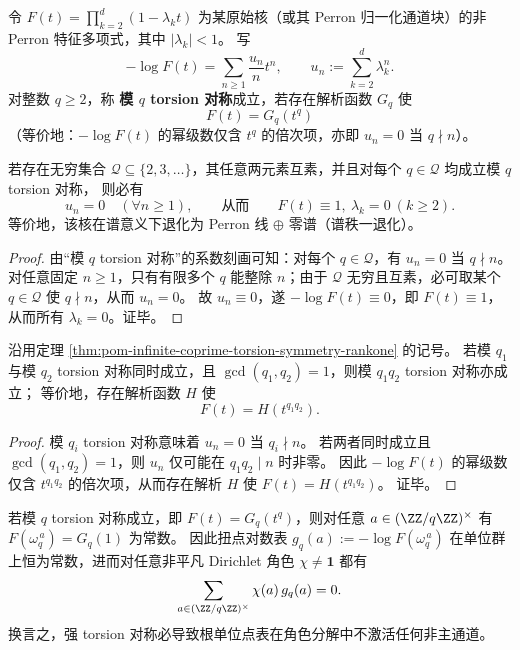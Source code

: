 \begin{theorem}\label{thm:pom-infinite-coprime-torsion-symmetry-rankone}
令 \(F(t)=\prod_{k=2}^{d}(1-\lambda_k t)\) 为某原始核（或其 Perron 归一化通道块）的非 Perron 特征多项式，其中 \(|\lambda_k|<1\)。
写
\[
-\log F(t)=\sum_{n\ge 1}\frac{u_n}{n}t^n,
\qquad
u_n:=\sum_{k=2}^{d}\lambda_k^n.
\]
对整数 \(q\ge 2\)，称 \textbf{模 \(q\) torsion 对称}成立，若存在解析函数 \(G_q\) 使
\[
\boxed{\;F(t)=G_q(t^q)\;}
\]
（等价地：\(-\log F(t)\) 的幂级数仅含 \(t^{q}\) 的倍次项，亦即 \(u_n=0\) 当 \(q\nmid n\)）。
\par
若存在无穷集合 \(\mathcal Q\subseteq\{2,3,\dots\}\)，其任意两元素互素，并且对每个 \(q\in\mathcal Q\) 均成立模 \(q\) torsion 对称，
则必有
\[
u_n=0\quad(\forall n\ge 1),
\qquad\text{从而}\qquad
F(t)\equiv 1,\ \lambda_k=0\ (k\ge 2).
\]
等价地，该核在谱意义下退化为 Perron 线 \(\oplus\) 零谱（谱秩一退化）。
\end{theorem}
\begin{proof}
由“模 \(q\) torsion 对称”的系数刻画可知：对每个 \(q\in\mathcal Q\)，有 \(u_n=0\) 当 \(q\nmid n\)。
对任意固定 \(n\ge 1\)，只有有限多个 \(q\) 能整除 \(n\)；由于 \(\mathcal Q\) 无穷且互素，必可取某个 \(q\in\mathcal Q\) 使 \(q\nmid n\)，从而 \(u_n=0\)。
故 \(u_n\equiv 0\)，遂 \(-\log F(t)\equiv 0\)，即 \(F(t)\equiv 1\)，从而所有 \(\lambda_k=0\)。证毕。
\end{proof}

\begin{corollary}[有限 torsion 对称的互素乘法闭合：两互素对称同时成立 \texorpdfstring{$\Rightarrow$}{=>} 乘积对称成立]\label{cor:pom-torsion-symmetry-coprime-closure}
沿用定理 \ref{thm:pom-infinite-coprime-torsion-symmetry-rankone} 的记号。
若模 \(q_1\) 与模 \(q_2\) torsion 对称同时成立，且 \(\gcd(q_1,q_2)=1\)，则模 \(q_1q_2\) torsion 对称亦成立；
等价地，存在解析函数 \(H\) 使
\[
F(t)=H\!\left(t^{q_1q_2}\right).
\]
\end{corollary}
\begin{proof}
模 \(q_i\) torsion 对称意味着 \(u_n=0\) 当 \(q_i\nmid n\)。
若两者同时成立且 \(\gcd(q_1,q_2)=1\)，则 \(u_n\) 仅可能在 \(q_1q_2\mid n\) 时非零。
因此 \(-\log F(t)\) 的幂级数仅含 \(t^{q_1q_2}\) 的倍次项，从而存在解析 \(H\) 使 \(F(t)=H(t^{q_1q_2})\)。
证毕。
\end{proof}



\begin{remark}[角色侧的可观测必要条件：torsion 对称 \texorpdfstring{$\Rightarrow$}{=>} 非主角色系数全消失]\label{rem:pom-torsion-symmetry-implies-no-nonprincipal-character}
若模 \(q\) torsion 对称成立，即 \(F(t)=G_q(t^q)\)，则对任意 \(a\in(\ZZ/q\ZZ)^\times\) 有
\(
F(\omega_q^{\,a})=G_q(1)
\)
为常数。
因此扭点对数表 \(g_q(a):=-\log F(\omega_q^{\,a})\) 在单位群上恒为常数，进而对任意非平凡 Dirichlet 角色 \(\chi\neq\mathbf 1\) 都有
\[
\sum_{a\in(\ZZ/q\ZZ)^\times}\chi(a)\,g_q(a)=0.
\]
换言之，强 torsion 对称必导致根单位点表在角色分解中不激活任何非主通道。
\end{remark}

